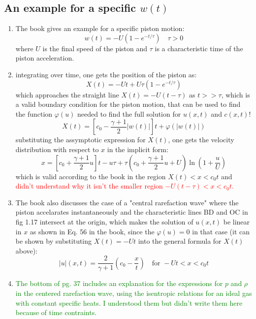 ﻿\documentclass[11pt]{article}
\begin{document}
\subsection{An example for a specific \texorpdfstring{$w(t)$}{w(t)}}
\begin{enumerate}
  \item The book gives an example for a specific piston motion:
  \begin{equation}
    w(t) = -U(1 - e^{-t/\tau}) \quad \tau > 0
  \end{equation}
  where $U$ is the final speed of the piston and $\tau$ is a characteristic time of the piston acceleration.
  \item integrating over time, one gets the position of the piston as:
  \begin{equation}
    X(t) = -Ut + U \tau (1 - e^{-t/\tau})
  \end{equation}
  which approaches the straight line $X(t) = -U(t-\tau)$ as $t >> \tau$, which is a valid boundary condition for the piston motion, that can be used to find the function $\varphi(u)$ needed to find the full solution for $u(x,t)$ and $c(x,t)$!
  \begin{equation}
    X(t) = \left[ c_0 - \frac{\gamma + 1}{2} |w(t)| \right] t + \varphi (|w(t)|)
  \end{equation}
  substituting the assymptotic expression for $X(t)$, one gets the velocity distribution with respect to $x$ in the implicit form:
  \begin{equation}
    \boxed{x = \left[ c_0 + \frac{\gamma + 1}{2} u \right] t - u\tau + \tau(c_0 + \frac{\gamma + 1}{2} u + U) \ln \left( 1 + \frac{u}{U} \right)}
  \end{equation}
  which is valid according to the book in the region $X(t) < x < c_0 t$ and \textcolor{red}{didn't understand why it isn't the smaller region $-U(t-\tau) < x < c_0 t$.}
  \item The book also discusses the case of a "central rarefaction wave" where the piston accelarates instantaneously and the characteristic lines BD and OC in fig 1.17 intersect at the origin, which makes the solution of $u(x,t)$ be linear in $x$ as shown in Eq. 56 in the book, since the $\varphi(u) = 0$ in that case (it can be shown by substituting $X(t) = -Ut$ into the general formula for $X(t)$ above):
  \begin{equation}
    |u|(x,t) = \frac{2}{\gamma + 1} \left( c_0 - \frac{x}{t} \right) \quad \text{for } -Ut < x < c_0 t
  \end{equation} 
  \item \textcolor{green}{The bottom of pg. 37 includes an explanation for the expressions for $p$ and $\rho$ in the centered rarefaction wave, using the isentropic relations for an ideal gas with constant specific heats. I understood them but didn't write them here because of time contraints.}
\end{enumerate}
\end{document}
